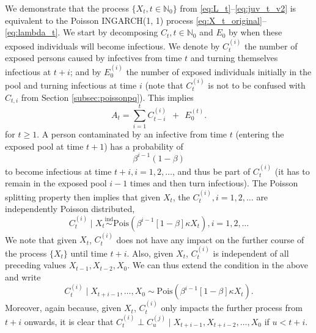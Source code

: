 \documentclass{article}
\begin{document}
We demonstrate that the process $\{X_t, t \in \mathbb{N}_0\}$ from \eqref{eq:L_t}--\eqref{eq:juv_t_v2} is equivalent to the Poisson INGARCH(1, 1) process \eqref{eq:X_t_original}--\eqref{eq:lambda_t}. We start by decomposing $C_t, t \in \mathbb{N}_0$ and $E_0$ by when these exposed individuals will become infectious. We denote by $C_t^{(i)}$ the number of exposed persons caused by infectives from time $t$ and turning themselves infectious at $t + i$; and by $E^{(i)}_0$ the number of exposed individuals initially in the pool and turning infectious at time $i$ (note that $C_t^{(i)}$ is not to be confused with $C_{t, i}$ from Section \ref{subsec:poissonpq}). This implies
\begin{equation}
A_t = \sum_{i = 1}^{t} C_{t - i}^{(i)} \ \ + \ \ E_0^{(t)}.
\label{eq:sums}
\end{equation}
for $ t \geq 1$. A person contaminated by an infective from time $t$ (entering the exposed pool at time $t + 1$) has a probability of 
\begin{equation}
\beta^{i - 1}(1 - \beta)\label{eq:geom_distr}
\end{equation}
to become infectious at time $t + i, i = 1, 2, \dots$, and thus be part of $C_t^{(i)}$ (it has to remain in the exposed pool $i - 1$ times and then turn infectious). The Poisson splitting property \cite{Kingman1993} then implies that given $X_t$, the $C_t^{(i)}, i =1, 2, \dots$ are independently Poisson distributed,
$$
C_t^{(i)} \mid X_t \stackrel{\text{ind}}{\sim} \text{Pois}(\beta^{i - 1}[1 - \beta]\kappa X_t), i =1, 2, \dots %
$$
We note that given $X_t$, $C_t^{(i)}$ does not have any impact on the further course of the process $\{X_t\}$ until time $t + i$. Also, given $X_t$, $C_t^{(i)}$ is independent of all preceding values $X_{t - 1}, X_{t - 2}, X_0$. We can thus extend the condition in the above and write
\begin{equation}
C_t^{(i)} \mid X_{t + i - 1}, \dots, X_0 \sim \text{Pois}(\beta^{i - 1}[1 - \beta]\kappa X_t). \label{eq:conditional_Cti} %
\end{equation}
Moreover, again because, given $X_t$, $C_t^{(i)}$ only impacts the further process from $t + i$ onwards, it is clear that $C_t^{(i)} \perp C_u^{(j)} \mid X_{t + i - 1}, X_{t + i - 2}, \dots, X_0$ if $u < t + i$.
\end{document}
